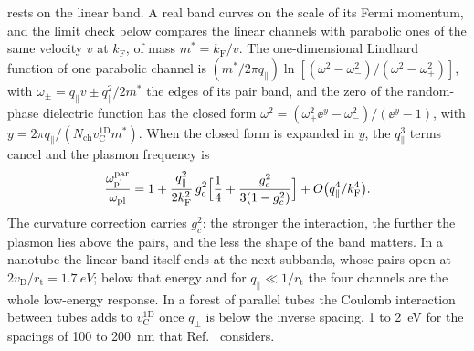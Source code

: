  rests on the linear band. A real band curves on the scale of its Fermi momentum, and the limit check below compares the linear channels with parabolic ones of the same velocity $v$ at $k_{\mathrm{F}}$, of mass $m^* = k_{\mathrm{F}}/v$. The one-dimensional Lindhard function of one parabolic channel is $(m^*/2\pi q_\parallel)\ln[(\omega^2 - \omega_-^2)/(\omega^2 - \omega_+^2)]$, with $\omega_\pm = q_\parallel v \pm q_\parallel^2/2m^*$ the edges of its pair band, and the zero of the random-phase dielectric function has the closed form $\omega^2 = (\omega_+^2\ee^{y} - \omega_-^2)/(\ee^{y} - 1)$, with $y = 2\pi q_\parallel/(N_{\mathrm{ch}}v_{\mathrm{C}}^{\mathrm{1D}}m^*)$. When the closed form is expanded in $y$, the $q_\parallel^3$ terms cancel and the plasmon frequency is
\begin{equation*}
  \frac{\omega_{\mathrm{pl}}^{\mathrm{par}}}{\omega_{\mathrm{pl}}} = 1 + \frac{q_\parallel^2}{2k_{\mathrm{F}}^2}\,g_c^2\Bigl[\frac14 + \frac{g_c^2}{3(1 - g_c^2)}\Bigr] + O\bigl(q_\parallel^4/k_{\mathrm{F}}^4\bigr) .
\end{equation*}
The curvature correction carries $g_c^2$: the stronger the interaction, the further the plasmon lies above the pairs, and the less the shape of the band matters. In a nanotube the linear band itself ends at the next subbands, whose pairs open at $2v_{\mathrm{D}}/r_{\mathrm{t}} = \SI{1.7}{eV}$; below that energy and for $q_\parallel \ll 1/r_{\mathrm{t}}$ the four channels are the whole low-energy response. In a forest of parallel tubes the Coulomb interaction between tubes adds to $v_{\mathrm{C}}^{\mathrm{1D}}$ once $q_\perp$ is below the inverse spacing, 1 to \SI{2}{eV} for the spacings of 100 to \SI{200}{nm} that Ref.~\cite{zhang2026luttinger} considers.

